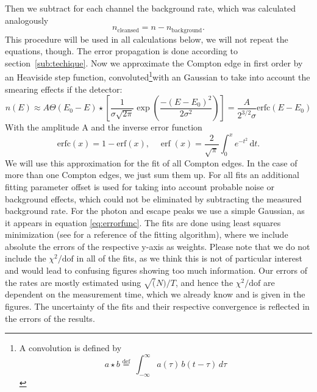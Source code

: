 Then we subtract for each channel the background rate, which
was calculated analogously 
\begin{equation}
    n_\mathrm{cleansed} = n -
    n_\mathrm{background}.
    \label{eq:rate2}
\end{equation}
This procedure will be used in all calculations below, we will
not repeat the equations, though. The error propagation is done
according to section~\ref{sub:techique}. Now we approximate
the Compton edge in first order by an Heaviside step function,
convoluted\footnote{ 
    A convolution is defined by
\begin{equation}
    a \star b   \stackrel{\mathrm{def}}{=}\ \int_{-\infty}^\infty a(\tau)\, b(t - \tau)\, d\tau 	
    \label{eq:conv}
\end{equation}

}with an Gaussian to take into account the smearing
effects if the detector:
\begin{equation}
    n(E)  \approx A\Theta(E_0 - E) \star  	
    \left[  \frac{1}{\sigma\sqrt{2\pi}} \exp \left( 
        \frac{-(E-E_0)^2}{2\sigma^2}\right)
        \right]  =\frac{A}{2^{3/2}\sigma} 
    \mathrm{erfc}(E - E_0) 
    \label{eq:errorfunc}
\end{equation}
With the amplitude A and the inverse error function
\begin{equation}
    \mathrm{erfc}(x) = 1 - \mathrm{erf}(x) , \quad
    \operatorname{erf}(x) = 
    \frac{2}{\sqrt\pi}\int_0^x e^{-t^2}\,\mathrm dt. 
    \label{eq:erfc}
\end{equation}
We will use this approximation for the fit of all Compton 
edges. In the case of more than one Compton edges, we just
sum them up. For all fits an additional fitting parameter offset
is used for taking into account probable noise or background
effects, which could not be eliminated by subtracting the 
measured background rate. For the photon and escape peaks we use 
a simple Gaussian, as it appears in equation \eqref{eq:errorfunc}.
The fits are done using least squares minimization (see 
\cite{scipy} for a reference of the fitting algorithm), where 
we include absolute the errors of the respective y-axis as 
weights. Please note
that we do not include the $\chi^2/\mathrm{dof}$ in all of the fits,
as we think this is not of particular interest and would lead
to confusing figures showing too much information. Our errors
of the rates are mostly estimated using $\sqrt(N)/T$, and hence
the $\chi^2/\mathrm{dof}$ are dependent 
on the measurement time, which we already know and
is given in the figures. The uncertainty of the fits and their
respective convergence is reflected in the errors of the 
results. 

